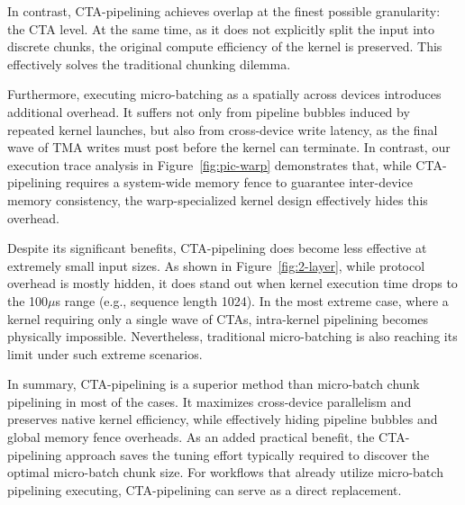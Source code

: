 In contrast, CTA-pipelining achieves overlap at the finest possible granularity: the CTA level. At the same time, as it does not explicitly split the input into discrete chunks, the original compute efficiency of the kernel is preserved. This effectively solves the traditional chunking dilemma. 

Furthermore, executing micro-batching as a spatially across devices introduces additional overhead. It suffers not only from pipeline bubbles induced by repeated kernel launches, but also from cross-device write latency, as the final wave of TMA writes must post before the kernel can terminate. In contrast, our execution trace analysis in Figure~\ref{fig:pic-warp} demonstrates that, while CTA-pipelining requires a system-wide memory fence to guarantee inter-device memory consistency, the warp-specialized kernel design effectively hides this overhead. 

Despite its significant benefits, CTA-pipelining does become less effective at extremely small input sizes. As shown in Figure~\ref{fig:2-layer}, while protocol overhead is mostly hidden, it does stand out when kernel execution time drops to the 100$\mu$s range (e.g., sequence length 1024). In the most extreme case, where a kernel requiring only a single wave of CTAs, intra-kernel pipelining becomes physically impossible. Nevertheless, traditional micro-batching is also reaching its limit under such extreme scenarios.

In summary, CTA-pipelining is a superior method than micro-batch chunk pipelining in most of the cases. It maximizes cross-device parallelism and preserves native kernel efficiency, while effectively hiding pipeline bubbles and global memory fence overheads. As an added practical benefit, the CTA-pipelining approach saves the tuning effort typically required to discover the optimal micro-batch chunk size. For workflows that already utilize micro-batch pipelining executing, CTA-pipelining can serve as a direct replacement. 


